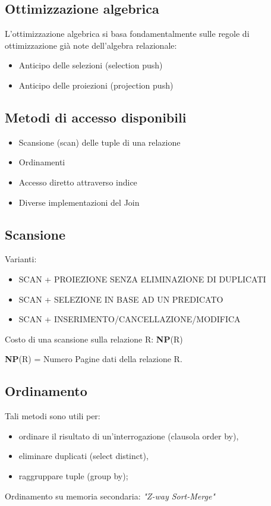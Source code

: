 \documentclass[a4paper, 10pt]{article}
\theoremstyle{definition}
\begin{document}
		\subsection{Ottimizzazione algebrica}
			L'ottimizzazione algebrica si basa fondamentalmente sulle
			regole di ottimizzazione già note dell'algebra relazionale:
			\begin{itemize}
				\item Anticipo delle selezioni (selection push)
				\item Anticipo delle proiezioni (projection push)
			\end{itemize}
			
		\subsection{Metodi di accesso disponibili}
			
			\begin{itemize}
				\item Scansione (scan) delle tuple di una relazione
				\item Ordinamenti
				\item Accesso diretto attraverso indice
				\item Diverse implementazioni del Join
			\end{itemize}
			
		\subsection*{Scansione}
			Varianti:
			\begin{itemize}
				\item SCAN + PROIEZIONE SENZA ELIMINAZIONE DI
				DUPLICATI
				\item SCAN + SELEZIONE IN BASE AD UN PREDICATO
				\item SCAN + INSERIMENTO/CANCELLAZIONE/MODIFICA
			\end{itemize}
			Costo di una scansione sulla relazione R: \textbf{NP}(R)
			
			\textbf{NP}(R) = Numero Pagine dati della relazione R.
			
		\subsection*{Ordinamento}
			Tali metodi sono utili per:
			\begin{itemize}
				\item ordinare il risultato di un'interrogazione (clausola order by),
				\item eliminare duplicati (select distinct),
				\item raggruppare tuple (group by);
			\end{itemize}
			Ordinamento su memoria secondaria: \textit{"Z-way Sort-Merge"}
			
\end{document}
